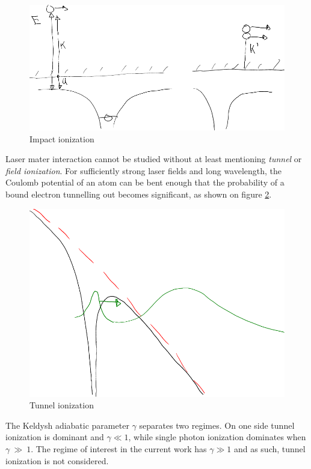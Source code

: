 \begin{figure}
 \centering
 \includegraphics[width=0.76\columnwidth]{figures/mockups/ionization_impact}
 \caption{Impact ionization}
 \label{fig:ionization:impact}
\end{figure}


Laser mater interaction cannot be studied without at least mentioning
\textit{tunnel} or \textit{field ionization}. For sufficiently strong laser
fields and long wavelength, the Coulomb potential of an atom can be bent enough
that the probability of a bound electron tunnelling out becomes significant, as
shown on figure \ref{fig:ionization:tunnel}.

\begin{figure}
 \centering
 \includegraphics[width=0.76\columnwidth]{figures/mockups/ionization_tunnel}
 \caption{Tunnel ionization}
 \label{fig:ionization:tunnel}
\end{figure}

The Keldysh adiabatic parameter $\gamma$ separates two regimes\cite{Fennel2010}.
On one side tunnel ionization is dominant and $\gamma \ll 1$, while single
photon ionization dominates when $\gamma~\gg~1$. The regime of interest in the
current work has $\gamma \gg 1$ and as such, tunnel ionization is not
considered.



